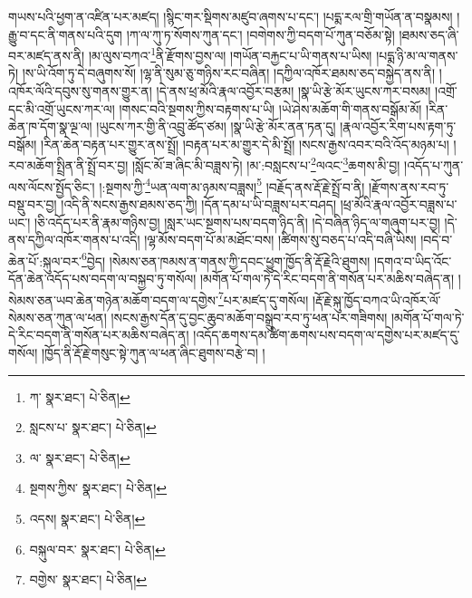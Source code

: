 གཡས་པའི་ཕྱག་ན་འཛིན་པར་མཛད། །སྙིང་གར་སྡིགས་མཛུབ་ཞགས་པ་དང་། །པདྨ་རལ་གྲི་གཡོན་ན་བསྣམས། །རྒྱུ་བ་དང་ནི་གནས་པའི་དུག །ཀ་ལ་ཀུ་ཏ་སོགས་ཀུན་དང་། །བགེགས་ཀྱི་བདག་པོ་ཀུན་བཅོམ་སྟེ། །ཐམས་ཅད་ཞི་བར་མཛད་ནས་ནི། །མ་ལུས་བཀའ་\footnote{ཀ་  སྣར་ཐང་།  པེ་ཅིན། }ནི་རྫོགས་བྱས་ལ། །གཡོན་བརྐྱང་པ་ཡི་གནས་པ་ཡིས། །པདྨ་ཉི་མ་ལ་གནས་ཏེ། །ས་ཡི་འོག་ཏུ་དེ་བཞུགས་སོ། །ལྷ་ནི་སུམ་ཅུ་གཉིས་རང་བཞིན། །དཀྱིལ་འཁོར་ཐམས་ཅད་བསྐྱེད་ནས་ནི། །འཁོར་ལོའི་དབུས་སུ་གནས་གྱུར་ན། །དེ་ནས་ཕྲ་མོའི་རྣལ་འབྱོར་བརྩམ། །སྣ་ཡི་རྩེ་མོར་ཡུངས་ཀར་བསམ། །འགྲོ་དང་མི་འགྲོ་ཡུངས་ཀར་ལ། །གསང་བའི་སྔགས་ཀྱིས་བརྟགས་པ་ཡི། །ཡེ་ཤེས་མཆོག་གི་གནས་བསྒོམ་མོ། །རིན་ཆེན་ཁ་དོག་སྣ་ལྔ་ལ། །ཡུངས་ཀར་གྱི་ནི་འབྲུ་ཚོད་ཙམ། །སྣ་ཡི་རྩེ་མོར་ནན་ཏན་དུ། །རྣལ་འབྱོར་རིག་པས་རྟག་ཏུ་བསྒོམ། །རིན་ཆེན་བརྟན་པར་གྱུར་ནས་སྤྲོ། །བརྟན་པར་མ་གྱུར་དེ་མི་སྤྲོ། །སངས་རྒྱས་འབར་བའི་འོད་མཉམ་པ། །རབ་མཆོག་སྤྲིན་ནི་སྤྲོ་བར་བྱ། །སློང་མོ་ཟ་ཞིང་མི་བཟླས་ཏེ། །མ་:བསླངས་པ་\footnote{སླངས་པ་  སྣར་ཐང་།  པེ་ཅིན། }ལའང་\footnote{ལ་  སྣར་ཐང་།  པེ་ཅིན། }ཆགས་མི་བྱ། །འདོད་པ་ཀུན་ལས་ལོངས་སྤྱོད་ཅིང་། །:སྔགས་ཀྱི་\footnote{སྔགས་ཀྱིས་  སྣར་ཐང་།  པེ་ཅིན། }ཡན་ལག་མ་ཉམས་བཟླས།\footnote{འདས།  སྣར་ཐང་།  པེ་ཅིན། } །བརྗོད་ནས་རྡོ་རྗེ་སྤྲོ་བ་ནི། །རྫོགས་ནས་རབ་ཏུ་བསྡུ་བར་བྱ། །འདི་ནི་སངས་རྒྱས་ཐམས་ཅད་ཀྱི། །དོན་དམ་པ་ཡི་བཟླས་པར་བཤད། །ཕྲ་མོའི་རྣལ་འབྱོར་བཟླས་པ་ཡང་། །ཅི་འདོད་པར་ནི་རྣམ་གཉིས་བྱ། །སླར་ཡང་སྔགས་པས་བདག་ཉིད་ནི། །དེ་བཞིན་ཉིད་ལ་གཞུག་པར་བྱ། །དེ་ནས་དཀྱིལ་འཁོར་གནས་པ་འདི། །ལྷ་མོས་བདག་པོ་མ་མཐོང་བས། །ཚིགས་སུ་བཅད་པ་འདི་བཞི་ཡིས། །བདེ་བ་ཆེན་པོ་:སྐུལ་བར་\footnote{བསྐུལ་བར་  སྣར་ཐང་།  པེ་ཅིན། }བྱེད། །སེམས་ཅན་ཁམས་ན་གནས་ཀྱི་དབང་ཕྱུག་ཁྱོད་ནི་རྡོ་རྗེའི་ཐུགས། །དགའ་བ་ཡིད་འོང་དོན་ཆེན་འདོད་པས་བདག་ལ་བསྐྱབ་ཏུ་གསོལ། །མགོན་པོ་གལ་ཏེ་དེ་རིང་བདག་ནི་གསོན་པར་མཆིས་བཞེད་ན། །སེམས་ཅན་ཡབ་ཆེན་གཉེན་མཆོག་བདག་ལ་དགྱེས་\footnote{བགྱེས་  སྣར་ཐང་།  པེ་ཅིན། }པར་མཛད་དུ་གསོལ། །རྡོ་རྗེ་སྐུ་ཁྱོད་བཀའ་ཡི་འཁོར་ལོ་སེམས་ཅན་ཀུན་ལ་ཕན། །སངས་རྒྱས་དོན་དུ་བྱང་ཆུབ་མཆོག་བསྒྲུབ་རབ་ཏུ་ཕན་པར་གཟིགས། །མགོན་པོ་གལ་ཏེ་དེ་རིང་བདག་ནི་གསོན་པར་མཆིས་བཞེད་ན། །འདོད་ཆགས་དམ་ཚིག་ཆགས་པས་བདག་ལ་དགྱེས་པར་མཛད་དུ་གསོལ། །ཁྱོད་ནི་རྡོ་རྗེ་གསུང་སྟེ་ཀུན་ལ་ཕན་ཞིང་ཐུགས་བརྩེ་བ། །
